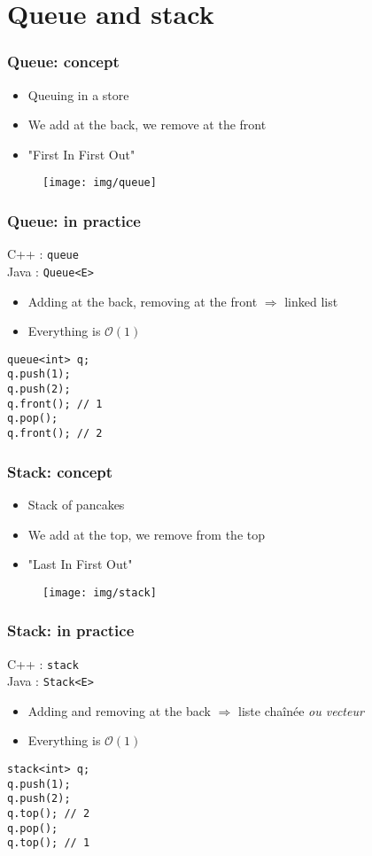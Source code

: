\documentclass[12pt]{beamer}
\newcommand{\bigoh}[1]{\mathcal{O}\left(#1\right)}
\newcommand{\constant}{\bigoh{1}}
\begin{document}
\section{Queue and stack}

\begin{frame}
\frametitle{Queue: concept}
\begin{itemize}
\item Queuing in a store
\item We add at the back, we remove at the front
\item "First In First Out"
\end{itemize}
\begin{figure}
\centering
\texttt{[image: img/queue]}
\end{figure}
\end{frame}

\begin{frame}[fragile]
\frametitle{Queue: in practice}
C++ : \texttt{queue} \\
Java : \texttt{Queue<E>}
\begin{itemize}
\item Adding at the back, removing at the front $\Rightarrow$ linked list
\item Everything is $\constant$
\end{itemize}
\begin{lstlisting}
queue<int> q;
q.push(1);
q.push(2);
q.front(); // 1
q.pop();
q.front(); // 2
\end{lstlisting}
\end{frame}

\begin{frame}
\frametitle{Stack: concept}
\begin{itemize}
\item Stack of pancakes
\item We add at the top, we remove from the top
\item "Last In First Out"
\end{itemize}
\begin{figure}
\centering
\texttt{[image: img/stack]}
\end{figure}
\end{frame}

\begin{frame}[fragile]
\frametitle{Stack: in practice}
C++ : \texttt{stack} \\
Java : \texttt{Stack<E>}
\begin{itemize}
\item Adding and removing at the back $\Rightarrow$ liste chaînée \emph{ou vecteur}
\item Everything is $\constant$
\end{itemize}
\begin{lstlisting}
stack<int> q;
q.push(1);
q.push(2);
q.top(); // 2
q.pop();
q.top(); // 1
\end{lstlisting}
\end{frame}
\end{document}

